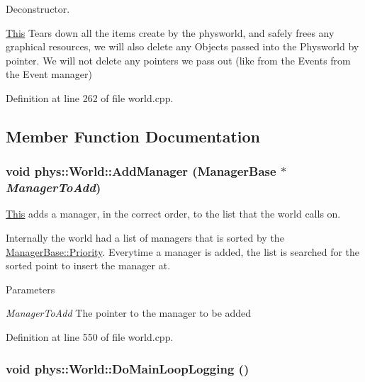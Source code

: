 Deconstructor. 

\hyperlink{structThis}{This} Tears down all the items create by the physworld, and safely frees any graphical resources, we will also delete any Objects passed into the Physworld by pointer. We will not delete any pointers we pass out (like from the Events from the Event manager) 

Definition at line 262 of file world.cpp.



\subsection{Member Function Documentation}
\hypertarget{classphys_1_1World_aa709932e21d9d19a91ee38cd7a575556}{
\subsubsection[{AddManager}]{\setlength{\rightskip}{0pt plus 5cm}void phys::World::AddManager ({\bf ManagerBase} $\ast$ {\em ManagerToAdd})}}
\label{da/ddf/classphys_1_1World_aa709932e21d9d19a91ee38cd7a575556}


\hyperlink{structThis}{This} adds a manager, in the correct order, to the list that the world calls on. 

Internally the world had a list of managers that is sorted by the \hyperlink{classphys_1_1ManagerBase_a28e2690fbcf644a7780a53b81821d8ef}{ManagerBase::Priority}. Everytime a manager is added, the list is searched for the sorted point to insert the manager at. 
\begin{DoxyParams}{Parameters}
\item[{\em ManagerToAdd}]The pointer to the manager to be added \end{DoxyParams}


Definition at line 550 of file world.cpp.

\hypertarget{classphys_1_1World_a1461e6c9d16214aa2cc310035b149378}{
\subsubsection[{DoMainLoopLogging}]{\setlength{\rightskip}{0pt plus 5cm}void phys::World::DoMainLoopLogging ()}}
\label{da/ddf/classphys_1_1World_a1461e6c9d16214aa2cc310035b149378}


